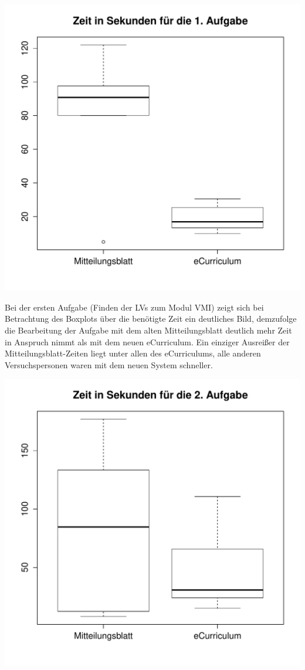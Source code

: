 \documentclass[a4paper,10pt]{scrartcl}
\begin{document}
\begin{center}
 \includegraphics[width=\linewidth]{./Appendix/Plots/Boxplots/a1_boxplot.pdf}
\end{center}

Bei der ersten Aufgabe (Finden der LVs zum Modul VMI) zeigt sich bei Betrachtung des Boxplots über die benötigte Zeit ein deutliches Bild, demzufolge die Bearbeitung der Aufgabe mit dem alten Mitteilungsblatt deutlich mehr Zeit in Anspruch nimmt als mit dem neuen eCurriculum. Ein einziger Ausreißer der Mitteilungsblatt-Zeiten liegt unter allen des eCurriculums, alle anderen Versuchspersonen waren mit dem neuen System schneller.

\begin{center}
 \includegraphics[width=\linewidth]{./Appendix/Plots/Boxplots/a2_boxplot.pdf}
\end{center}
\end{document}
